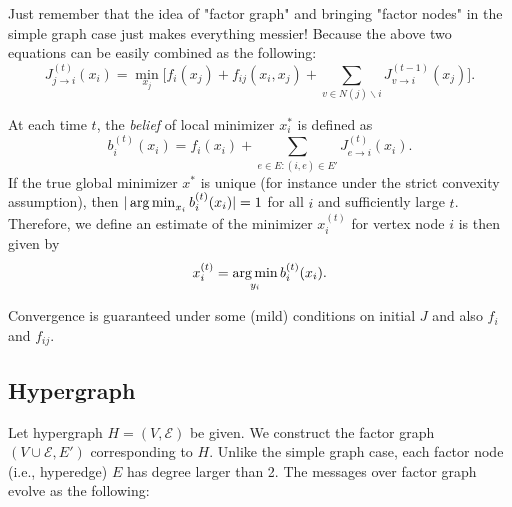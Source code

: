 {\color{blue}Just remember that the idea of "factor graph" and bringing "factor nodes" in the simple graph case just makes everything messier! Because the above two equations can be easily combined as the following: 
\begin{equation}\label{Eq:Update}
    J^{(t)}_{j\to i}(x_i) =  \min_{x_j}\Big[f_i(x_j) + f_{ij}(x_i, x_j) + \sum_{v\in N(j)\backslash i}J^{(t-1)}_{v\to i}(x_j)\Big].
\end{equation}
}




At each time $t$, the \textit{belief} of local minimizer $x^*_i$ is defined as 
$$b^{(t)}_i(x_i) = f_i(x_i) + \sum_{e\in E: (i, e)\in E'} J^{(t)}_{e\to i}(x_i).$$ If the true global minimizer $x^*$ is unique (for instance under the strict convexity assumption), then $|\mathop{\rm arg\, min}_{x_i} b_i^{(t)}(x_i)|=1$ for all $i$ and sufficiently large $t$. Therefore, we define an estimate of the minimizer $x^{(t)}_i$ for vertex node $i$ is then given by 
$$x_i^{(t)} = \mathop{\rm arg\, min}_{y_i} b^{(t)}_i(x_i).$$


Convergence is guaranteed under some (mild) conditions on initial $J$ and also $f_i$ and $f_{ij}$. 






\subsection{Hypergraph}





Let hypergraph $H=(V, \mathcal E)$ be given. We construct the factor graph $(V\cup \mathcal E, E')$ corresponding to $H$. Unlike the simple graph case, each factor node (i.e., hyperedge) $E$ has degree larger than 2. The messages over factor graph evolve as the following:

